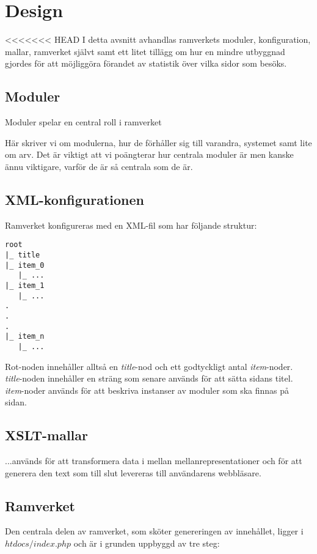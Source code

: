 \section{Design}
<<<<<<< HEAD
I detta avsnitt avhandlas ramverkets moduler, konfiguration, mallar, ramverket
självt samt ett litet tillägg om hur en mindre utbyggnad gjordes för att
möjliggöra förandet av statistik över vilka sidor som besöks.

\subsection{Moduler}
Moduler spelar en central roll i ramverket 

Här skriver vi om modulerna, hur de förhåller sig till varandra, systemet samt
lite om arv. Det är viktigt att vi poängterar hur centrala moduler är men kanske
ännu viktigare, varför de är så centrala som de är.

\subsection{XML-konfigurationen}
Ramverket konfigureras med en XML-fil som har följande struktur:

\begin{verbatim}
root
|_ title
|_ item_0
   |_ ...
|_ item_1
   |_ ...
.
.
.
|_ item_n
   |_ ...
\end{verbatim}

Rot-noden innehåller alltså en {\it title}-nod och ett godtyckligt antal
{\it item}-noder. {\it title}-noden innehåller en sträng som senare används för
att sätta sidans titel. {\it item}-noder används för att beskriva instanser av
moduler som ska finnas på sidan.

\subsection{XSLT-mallar}
...används för att transformera data i mellan mellanrepresentationer och för att
generera den text som till slut levereras till användarens webbläsare.

\subsection{Ramverket}
Den centrala delen av ramverket, som sköter genereringen av innehållet, ligger
i $htdocs/index.php$ och är i grunden uppbyggd av tre steg:

